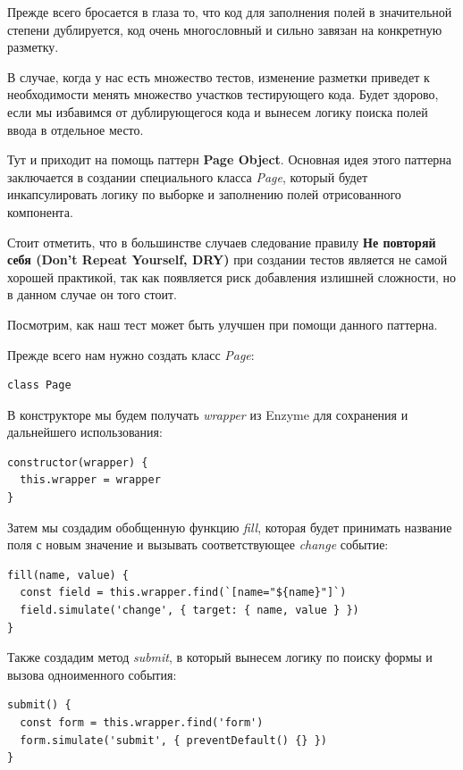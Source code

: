 Прежде всего бросается в глаза то, что код для заполнения полей в значительной степени дублируется, код очень многословный и сильно завязан на конкретную разметку.

В случае, когда у нас есть множество тестов, изменение разметки приведет к необходимости менять множество участков тестирующего кода. Будет здорово, если мы избавимся от дублирующегося кода и вынесем логику поиска полей ввода в отдельное место.

Тут и приходит на помощь паттерн \textbf{Page Object}. Основная идея этого паттерна заключается в создании специального класса \textit{Page}, который будет инкапсулировать логику по выборке и заполнению полей отрисованного компонента.

Стоит отметить, что в большинстве случаев следование правилу \textbf{Не повторяй себя (Don't Repeat Yourself, DRY)} при создании тестов является не самой хорошей практикой, так как появляется риск добавления излишней сложности, но в данном случае он того стоит.

Посмотрим, как наш тест может быть улучшен при помощи данного паттерна.

Прежде всего нам нужно создать класс \textit{Page}:

\begin{lstlisting}
class Page
\end{lstlisting}

В конструкторе мы будем получать \textit{wrapper} из Enzyme для сохранения и дальнейшего использования:

\begin{lstlisting}
constructor(wrapper) {
  this.wrapper = wrapper
}
\end{lstlisting}

Затем мы создадим обобщенную функцию \textit{fill}, которая будет принимать название поля с новым значение и вызывать соответствующее \textit{change} событие:

\begin{lstlisting}
fill(name, value) {
  const field = this.wrapper.find(`[name="${name}"]`)
  field.simulate('change', { target: { name, value } })
}
\end{lstlisting}

Также создадим метод \textit{submit}, в который вынесем логику по поиску формы и вызова одноименного события:

\begin{lstlisting}
submit() {
  const form = this.wrapper.find('form')
  form.simulate('submit', { preventDefault() {} })
}
\end{lstlisting}

